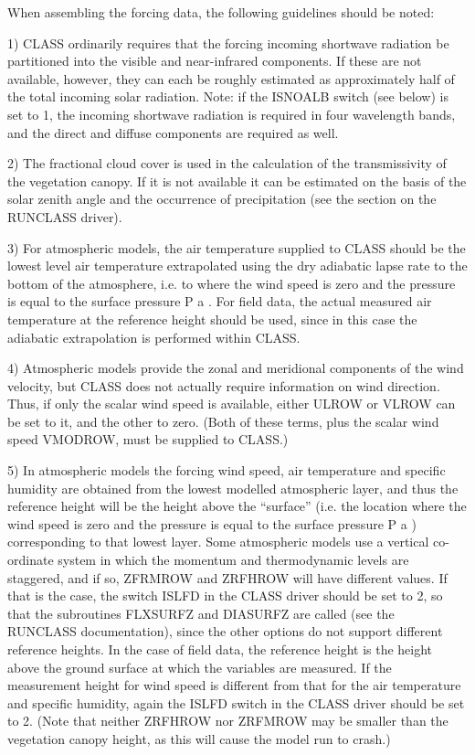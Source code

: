 When assembling the forcing data, the following guidelines should be noted\+:

1) C\+L\+A\+S\+S ordinarily requires that the forcing incoming shortwave radiation be partitioned into the visible and near-\/infrared components. If these are not available, however, they can each be roughly estimated as approximately half of the total incoming solar radiation. Note\+: if the I\+S\+N\+O\+A\+L\+B switch (see below) is set to 1, the incoming shortwave radiation is required in four wavelength bands, and the direct and diffuse components are required as well.

2) The fractional cloud cover is used in the calculation of the transmissivity of the vegetation canopy. If it is not available it can be estimated on the basis of the solar zenith angle and the occurrence of precipitation (see the section on the R\+U\+N\+C\+L\+A\+S\+S driver).

3) For atmospheric models, the air temperature supplied to C\+L\+A\+S\+S should be the lowest level air temperature extrapolated using the dry adiabatic lapse rate to the bottom of the atmosphere, i.\+e. to where the wind speed is zero and the pressure is equal to the surface pressure P a . For field data, the actual measured air temperature at the reference height should be used, since in this case the adiabatic extrapolation is performed within C\+L\+A\+S\+S.

4) Atmospheric models provide the zonal and meridional components of the wind velocity, but C\+L\+A\+S\+S does not actually require information on wind direction. Thus, if only the scalar wind speed is available, either U\+L\+R\+O\+W or V\+L\+R\+O\+W can be set to it, and the other to zero. (Both of these terms, plus the scalar wind speed V\+M\+O\+D\+R\+O\+W, must be supplied to C\+L\+A\+S\+S.)

5) In atmospheric models the forcing wind speed, air temperature and specific humidity are obtained from the lowest modelled atmospheric layer, and thus the reference height will be the height above the “surface” (i.\+e. the location where the wind speed is zero and the pressure is equal to the surface pressure P a ) corresponding to that lowest layer. Some atmospheric models use a vertical co-\/ordinate system in which the momentum and thermodynamic levels are staggered, and if so, Z\+F\+R\+M\+R\+O\+W and Z\+R\+F\+H\+R\+O\+W will have different values. If that is the case, the switch I\+S\+L\+F\+D in the C\+L\+A\+S\+S driver should be set to 2, so that the subroutines F\+L\+X\+S\+U\+R\+F\+Z and D\+I\+A\+S\+U\+R\+F\+Z are called (see the R\+U\+N\+C\+L\+A\+S\+S documentation), since the other options do not support different reference heights. In the case of field data, the reference height is the height above the ground surface at which the variables are measured. If the measurement height for wind speed is different from that for the air temperature and specific humidity, again the I\+S\+L\+F\+D switch in the C\+L\+A\+S\+S driver should be set to 2. (Note that neither Z\+R\+F\+H\+R\+O\+W nor Z\+R\+F\+M\+R\+O\+W may be smaller than the vegetation canopy height, as this will cause the model run to crash.)

